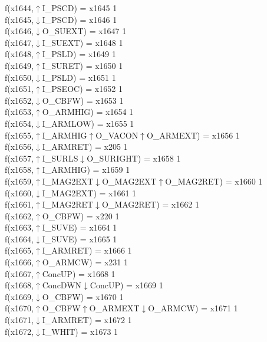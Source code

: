 f(x1644,$\uparrow$I\_PSCD) = x1645 {1} \\
f(x1645,$\downarrow$I\_PSCD) = x1646 {1} \\
f(x1646,$\downarrow$O\_SUEXT) = x1647 {1} \\
f(x1647,$\downarrow$I\_SUEXT) = x1648 {1} \\
f(x1648,$\uparrow$I\_PSLD) = x1649 {1} \\
f(x1649,$\uparrow$I\_SURET) = x1650 {1} \\
f(x1650,$\downarrow$I\_PSLD) = x1651 {1} \\
f(x1651,$\uparrow$I\_PSEOC) = x1652 {1} \\
f(x1652,$\downarrow$O\_CBFW) = x1653 {1} \\
f(x1653,$\uparrow$O\_ARMHIG) = x1654 {1} \\
f(x1654,$\downarrow$I\_ARMLOW) = x1655 {1} \\
f(x1655,$\uparrow$I\_ARMHIG$\uparrow$O\_VACON$\uparrow$O\_ARMEXT) = x1656 {1} \\
f(x1656,$\downarrow$I\_ARMRET) = x205 {1} \\
f(x1657,$\uparrow$I\_SURLS$\downarrow$O\_SURIGHT) = x1658 {1} \\
f(x1658,$\uparrow$I\_ARMHIG) = x1659 {1} \\
f(x1659,$\uparrow$I\_MAG2EXT$\downarrow$O\_MAG2EXT$\uparrow$O\_MAG2RET) = x1660 {1} \\
f(x1660,$\downarrow$I\_MAG2EXT) = x1661 {1} \\
f(x1661,$\uparrow$I\_MAG2RET$\downarrow$O\_MAG2RET) = x1662 {1} \\
f(x1662,$\uparrow$O\_CBFW) = x220 {1} \\
f(x1663,$\uparrow$I\_SUVE) = x1664 {1} \\
f(x1664,$\downarrow$I\_SUVE) = x1665 {1} \\
f(x1665,$\uparrow$I\_ARMRET) = x1666 {1} \\
f(x1666,$\uparrow$O\_ARMCW) = x231 {1} \\
f(x1667,$\uparrow$ConcUP) = x1668 {1} \\
f(x1668,$\uparrow$ConcDWN$\downarrow$ConcUP) = x1669 {1} \\
f(x1669,$\downarrow$O\_CBFW) = x1670 {1} \\
f(x1670,$\uparrow$O\_CBFW$\uparrow$O\_ARMEXT$\downarrow$O\_ARMCW) = x1671 {1} \\
f(x1671,$\downarrow$I\_ARMRET) = x1672 {1} \\
f(x1672,$\downarrow$I\_WHIT) = x1673 {1} \\
